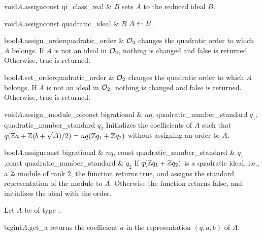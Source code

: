 \begin{fcode}{void}{$A$.assign}{const qi_class_real & $B$}
  sets $A$ to the reduced ideal $B$.
\end{fcode}

\begin{fcode}{void}{$A$.assign}{const quadratic_ideal & $B$}
  $A \leftarrow B$.
\end{fcode}

\begin{fcode}{bool}{$A$.assign_order}{quadratic_order & $\mathcal{O}_2$}
  changes the quadratic order to which $A$ belongs.  If $A$ is not an ideal in $\mathcal{O}_2$, nothing
  is changed and false is returned.  Otherwise, true is returned.
\end{fcode}

\begin{fcode}{bool}{$A$.set_order}{quadratic_order & $\mathcal{O}_2$}
  changes the quadratic order to which $A$ belongs.  If $A$ is not an ideal in $\mathcal{O}_2$, nothing
  is changed and false is returned.  Otherwise, true is returned.
\end{fcode}

\begin{Tfcode}{void}{$A$.assign_module_of}{const bigrational & $nq$,
    quadratic_number_standard $q_1$, quadratic_number_standard $q_2$}%
    Initializes the coefficients of $A$ such that $q (\mathbb{Z} a + \mathbb{Z}
    (b + \sqrt{\varDelta})/2) = n q (\mathbb{Z} q_1 + \mathbb{Z} q_2)$ without assigning an order to $A$.
\end{Tfcode}

\begin{fcode}{bool}{$A$.assign}{const bigrational & $nq$,
    const quadratic_number_standard & $q_1$,const quadratic_number_standard & $q_2$}%
  If $q (\mathbb{Z} q_1 + \mathbb{Z} q_2)$ is a quadratic ideal, i.e., a $\mathbb{Z}$ module of rank $2$, the
  function returns true, and assigns the standard representation of the module to $A$.
  Otherwise the function returns false, and initializes the ideal with the order.
\end{fcode}



\ACCS

Let $A$ be of type .

\begin{cfcode}{bigint}{$A$.get_a}{}
  returns the coefficient $a$ in the representation $(q,a,b)$ of $A$.
\end{cfcode}

